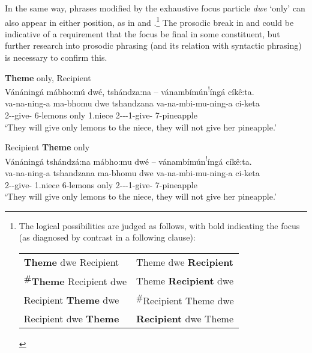 \documentclass[output=paper]{langscibook}
\begin{document}
In the same way, phrases modified by the exhaustive focus particle \textit{dwe} ‘only’ can also appear in either position, as in  and .\footnote{The logical possibilities are judged as follows, with bold indicating the focus (as diagnosed by contrast in a following clause):\\
\begin{tabular}{ll}
\textbf{Theme} dwe Recipient &  Theme dwe \textbf{Recipient}\\
\textbf{\textsuperscript{\#}Theme} Recipient dwe & Theme \textbf{Recipient} dwe\\
Recipient \textbf{Theme} dwe & \textsuperscript{\#}Recipient Theme dwe\\
Recipient dwe \textbf{Theme} &  \textbf{Recipient} dwe Theme\\
\end{tabular}
}
The prosodic break in  and  could be indicative of a requirement that the focus be final in some constituent, but further research into prosodic phrasing (and its relation with syntactic phrasing) is necessary to confirm this.

\ea\label{bkm:Ref121149095}
\ea
\label{bkm:Ref121149095:a}
\textbf{Theme} only, Recipient \\
Vánáningá mábho:mú dwé, tshándza:na -- vánambímún\textsuperscript{!}íngá cíkê:ta.\\
\gll
va-na-ning-a  ma-bhomu  dwe  tshandzana  va-na-mbi-mu-ning-a  ci-keta\\
2\SM{}-\FUT{}-give-\FV{}  6-lemons  only  1.niece 2\SM{}-\FUT{}-\NEG{}-1\OM{}-give-\FV{}  7-pineapple\\
\glt
‘They will give only lemons to the niece, they will not give her pineapple.’

\ex
\label{bkm:Ref121149095:b}
Recipient \textbf{Theme} only\\
Vánáningá tshándzá:na mábho:mu dwé -- vánambímún\textsuperscript{!}íngá cíkê:ta.\\
\gll
va-na-ning-a  tshandzana  ma-bhomu  dwe  va-na-mbi-mu-ning-a  ci-keta\\
2\SM{}-\FUT{}-give-\FV{}  1.niece  6-lemons  only  2\SM{}-\FUT{}-\NEG{}-1\OM{}-give-\FV{}  7-pineapple\\
\glt
‘They will give only lemons to the niece, they will not give her pineapple.’
\end{document}
